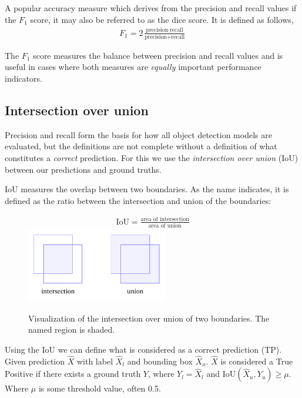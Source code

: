 A popular accuracy measure which derives from the precision and recall values if the \(F_1\) score, it may also be referred to as the dice score.
It is defined as follows,
%
\begin{align*}
  F_1=2\frac{\text{precision}\cdot\text{recall}}{\text{precision}+\text{recall}}
\end{align*}

The \(F_1\) score measures the balance between precision and recall values and is useful in cases where both measures are \textit{equally} important performance indicators.

\subsection{Intersection over union}
Precision and recall form the basis for how all object detection models are evaluated, but the definitions are not complete without a definition of what constitutes a \textit{correct} prediction.
For this we use the \textit{intersection over union} (IoU) between our predictions and ground truths.

IoU measures the overlap between two boundaries.
As the name indicates, it is defined as the ratio between the intersection and union of the boundaries:

\begin{figure}[htb]
  \centering
  \begin{gather*}
    \text{IoU}=\frac{\text{area of intersection}}{\text{area of union}}
  \end{gather*}
  \includegraphics[width=0.55\textwidth]{figs/background/iou.pdf}
\caption[Intersection over union]{Visualization of the intersection over union of two boundaries.
The named region is shaded.}\label{fig:iou}
\end{figure}

Using the IoU we can define what is considered as a correct prediction (TP).
Given prediction \(\hat{X}\) with label \(\hat{X}_l\) and bounding box \(\hat{X}_u\). \(\hat{X}\) is considered a True Positive if there exists a ground truth \(Y\), where \(Y_{l}=\hat{X}_l\) and \(\text{IoU}(\hat{X}_u, Y_{u})\ge \mu \).
Where \( \mu \) is some threshold value, often 0.5.


